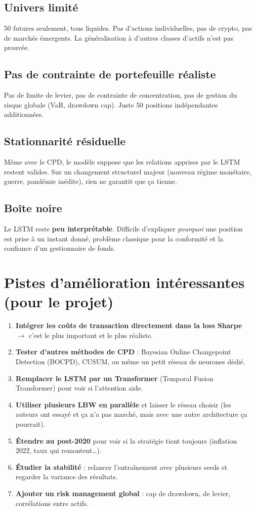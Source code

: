 \documentclass[11pt,a4paper]{article}
\begin{document}
\subsection{Univers limité}
50 futures seulement, tous liquides. Pas d'actions individuelles, pas de crypto, pas de marchés émergents. La généralisation à d'autres classes d'actifs n'est pas prouvée.

\subsection{Pas de contrainte de portefeuille réaliste}
Pas de limite de levier, pas de contrainte de concentration, pas de gestion du risque globale (VaR, drawdown cap). Juste 50 positions indépendantes additionnées.

\subsection{Stationnarité résiduelle}
Même avec le CPD, le modèle suppose que les relations apprises par le LSTM restent valides. Sur un changement structurel majeur (nouveau régime monétaire, guerre, pandémie inédite), rien ne garantit que ça tienne.

\subsection{Boîte noire}
Le LSTM reste \textbf{peu interprétable}. Difficile d'expliquer \emph{pourquoi} une position est prise à un instant donné, problème classique pour la conformité et la confiance d'un gestionnaire de fonds.

\section{Pistes d'amélioration intéressantes (pour le projet)}

\begin{enumerate}[leftmargin=*]
    \item \textbf{Intégrer les coûts de transaction directement dans la loss Sharpe} $\rightarrow$ c'est le plus important et le plus réaliste.
    \item \textbf{Tester d'autres méthodes de CPD} : Bayesian Online Changepoint Detection (BOCPD), CUSUM, ou même un petit réseau de neurones dédié.
    \item \textbf{Remplacer le LSTM par un Transformer} (Temporal Fusion Transformer) pour voir si l'attention aide.
    \item \textbf{Utiliser plusieurs LBW en parallèle} et laisser le réseau choisir (les auteurs ont essayé et ça n'a pas marché, mais avec une autre architecture ça pourrait).
    \item \textbf{Étendre au post-2020} pour voir si la stratégie tient toujours (inflation 2022, taux qui remontent\ldots).
    \item \textbf{Étudier la stabilité} : relancer l'entraînement avec plusieurs seeds et regarder la variance des résultats.
    \item \textbf{Ajouter un risk management global} : cap de drawdown, de levier, corrélations entre actifs.
\end{enumerate}
\end{document}
